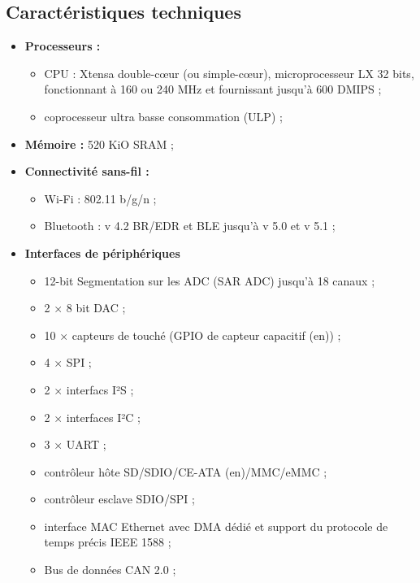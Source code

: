     \subsection{Caractéristiques techniques}\cite{33}
        \begin{itemize}
            \item[\textbullet]\textbf{Processeurs :}
                \begin{itemize}
                    \item CPU : Xtensa double-cœur (ou simple-cœur), microprocesseur LX 32 bits, fonctionnant à 160 ou 240 MHz et fournissant jusqu'à 600 DMIPS ;
                    \item coprocesseur ultra basse consommation (ULP) ;
                \end{itemize}
            \item[\textbullet]\textbf{Mémoire :} 520 KiO SRAM ;
            \item[\textbullet]\textbf{Connectivité sans-fil :}
                \begin{itemize}
                    \item Wi-Fi : 802.11 b/g/n ;
                    \item Bluetooth : v 4.2 BR/EDR et BLE jusqu'à v 5.0 et v 5.1 ;
                \end{itemize}
            \item[\textbullet]\textbf{Interfaces de périphériques}
                 \begin{itemize}
                    \item 12-bit Segmentation sur les ADC (SAR ADC) jusqu'à 18 canaux ;
                    \item 2 × 8 bit DAC ;
                    \item 10 × capteurs de touché (GPIO de capteur capacitif (en)) ;
                    \item 4 × SPI ;
                    \item 2 × interfacs I²S ;
                    \item 2 × interfaces I²C ;
                    \item 3 × UART ;
                    \item contrôleur hôte SD/SDIO/CE-ATA (en)/MMC/eMMC ;
                    \item contrôleur esclave SDIO/SPI ;
                    \item interface MAC Ethernet avec DMA dédié et support du protocole de temps précis IEEE 1588 ;
                    \item Bus de données CAN 2.0 ;

\end{itemize}
\end{itemize}
